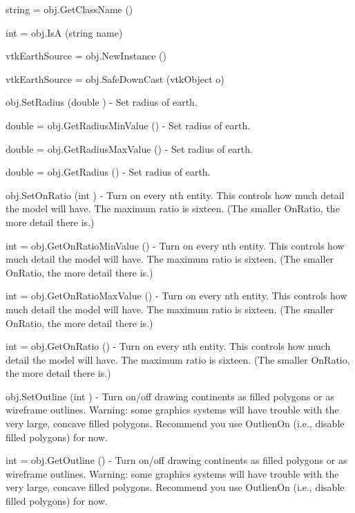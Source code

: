 \begin{DoxyItemize}
\item {\ttfamily string = obj.\-Get\-Class\-Name ()}  
\item {\ttfamily int = obj.\-Is\-A (string name)}  
\item {\ttfamily vtk\-Earth\-Source = obj.\-New\-Instance ()}  
\item {\ttfamily vtk\-Earth\-Source = obj.\-Safe\-Down\-Cast (vtk\-Object o)}  
\item {\ttfamily obj.\-Set\-Radius (double )} -\/ Set radius of earth.  
\item {\ttfamily double = obj.\-Get\-Radius\-Min\-Value ()} -\/ Set radius of earth.  
\item {\ttfamily double = obj.\-Get\-Radius\-Max\-Value ()} -\/ Set radius of earth.  
\item {\ttfamily double = obj.\-Get\-Radius ()} -\/ Set radius of earth.  
\item {\ttfamily obj.\-Set\-On\-Ratio (int )} -\/ Turn on every nth entity. This controls how much detail the model will have. The maximum ratio is sixteen. (The smaller On\-Ratio, the more detail there is.)  
\item {\ttfamily int = obj.\-Get\-On\-Ratio\-Min\-Value ()} -\/ Turn on every nth entity. This controls how much detail the model will have. The maximum ratio is sixteen. (The smaller On\-Ratio, the more detail there is.)  
\item {\ttfamily int = obj.\-Get\-On\-Ratio\-Max\-Value ()} -\/ Turn on every nth entity. This controls how much detail the model will have. The maximum ratio is sixteen. (The smaller On\-Ratio, the more detail there is.)  
\item {\ttfamily int = obj.\-Get\-On\-Ratio ()} -\/ Turn on every nth entity. This controls how much detail the model will have. The maximum ratio is sixteen. (The smaller On\-Ratio, the more detail there is.)  
\item {\ttfamily obj.\-Set\-Outline (int )} -\/ Turn on/off drawing continents as filled polygons or as wireframe outlines. Warning\-: some graphics systems will have trouble with the very large, concave filled polygons. Recommend you use Outlien\-On (i.\-e., disable filled polygons) for now.  
\item {\ttfamily int = obj.\-Get\-Outline ()} -\/ Turn on/off drawing continents as filled polygons or as wireframe outlines. Warning\-: some graphics systems will have trouble with the very large, concave filled polygons. Recommend you use Outlien\-On (i.\-e., disable filled polygons) for now.  

\end{DoxyItemize}
